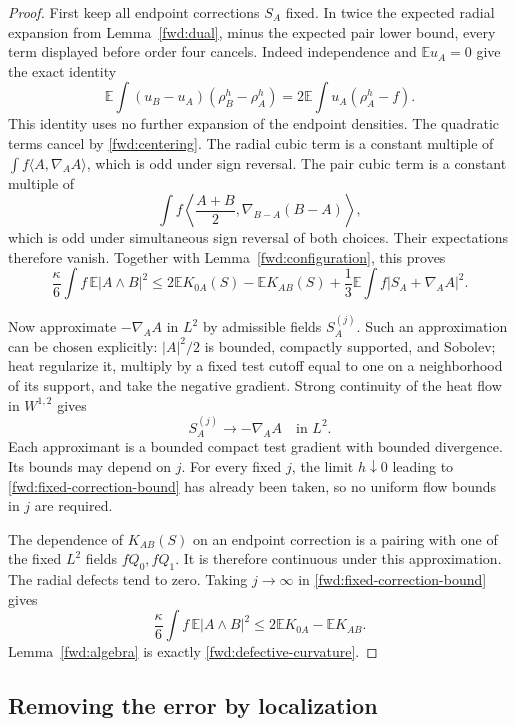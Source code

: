 \begin{proof}
First keep all endpoint corrections \(S_A\) fixed. In twice the
expected radial expansion from Lemma~\ref{fwd:dual}, minus the
expected pair lower bound, every term displayed before order four
cancels. Indeed independence and \(\mathbb E u_A=0\) give the exact
identity
\[
 \mathbb E\int(u_B-u_A)(\rho^h_B-\rho^h_A)
 =2\mathbb E\int u_A(\rho^h_A-f).
\]
This identity uses no further expansion of the endpoint densities.
The quadratic terms cancel by \eqref{fwd:centering}. The radial
cubic term is a constant multiple of
\(\int f\langle A,\nabla_AA\rangle\), which is odd under sign
reversal. The pair cubic term is a constant multiple of
\[
 \int f\left\langle\frac{A+B}{2},\nabla_{B-A}(B-A)\right\rangle,
\]
which is odd under simultaneous sign reversal of both choices.
Their expectations therefore vanish. Together with
Lemma~\ref{fwd:configuration}, this proves
\begin{equation}
\label{fwd:fixed-correction-bound}
 \frac\kappa6\int f\,\mathbb E|A\wedge B|^2
 \leq 2\mathbb E K_{0A}(S)-\mathbb E K_{AB}(S)
       +\frac13\mathbb E\int f|S_A+\nabla_AA|^2.
\end{equation}

Now approximate \(-\nabla_AA\) in \(L^2\) by admissible fields
\(S_A^{(j)}\). Such an approximation can be chosen explicitly:
\(|A|^2/2\) is bounded, compactly supported, and Sobolev; heat
regularize it, multiply by a fixed test cutoff equal to one on a
neighborhood of its support, and take the negative gradient.
Strong continuity of the heat flow in \(W^{1,2}\) gives
\[
 S_A^{(j)}\longrightarrow-\nabla_AA\quad\text{in }L^2.
\]
Each approximant is a bounded compact test gradient with bounded
divergence. Its bounds may depend on \(j\). For every fixed \(j\),
the limit \(h\downarrow0\) leading to
\eqref{fwd:fixed-correction-bound} has already been taken, so no
uniform flow bounds in \(j\) are required.

The dependence of \(K_{AB}(S)\) on an endpoint correction is a
pairing with one of the fixed \(L^2\) fields \(fQ_0,fQ_1\).
It is therefore continuous under this approximation. The radial
defects tend to zero. Taking \(j\to\infty\) in
\eqref{fwd:fixed-correction-bound} gives
\[
 \frac\kappa6\int f\,\mathbb E|A\wedge B|^2
 \leq2\mathbb E K_{0A}-\mathbb E K_{AB}.
\]
Lemma~\ref{fwd:algebra} is exactly
\eqref{fwd:defective-curvature}.
\end{proof}

\subsection{Removing the error by localization}

